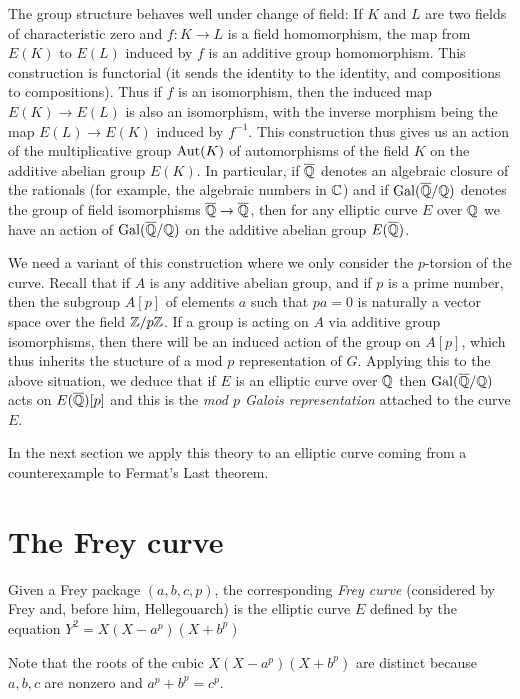 The group structure behaves well under change of field: If $K$ and $L$ are two fields of characteristic zero and $f:K\to L$ is a field homomorphism, the map from $E(K)$ to $E(L)$ induced by $f$ is an additive group homomorphism. This construction is functorial (it sends the identity to the identity, and compositions to compositions). Thus if $f$ is an isomorphism, then the induced map $E(K)\to E(L)$ is also an isomorphism, with the inverse morphism being the map $E(L)\to E(K)$ induced by $f^{-1}$. This construction thus gives us an action of the multiplicative group $\operatorname{Aut}(K)$ of automorphisms of the field $K$ on the additive abelian group $E(K)$. In particular, if $\overline{\mathbb{Q}}$ denotes an algebraic closure of the rationals (for example, the algebraic numbers in $\mathbb{C}$) and if $\operatorname{Gal}(\overline{\mathbb{Q}}/\mathbb{Q})$ denotes the group of field isomorphisms $\overline{\mathbb{Q}}\to\overline{\mathbb{Q}}$, then for any elliptic curve $E$ over $\mathbb{Q}$ we have an action of $\operatorname{Gal}(\overline{\mathbb{Q}}/\mathbb{Q})$ on the additive abelian group $E(\overline{\mathbb{Q}})$.

We need a variant of this construction where we only consider the $p$-torsion of the curve. Recall that if $A$ is any additive abelian group, and if $p$ is a prime number, then the subgroup $A[p]$ of elements $a$ such that $pa=0$ is naturally a vector space over the field $\mathbb{Z}/p\mathbb{Z}$. If a group is acting on $A$ via additive group isomorphisms, then there will be an induced action of the group on $A[p]$, which thus inherits the stucture of a mod $p$ representation of $G$. Applying this to the above situation, we deduce that if $E$ is an elliptic curve over $\mathbb{Q}$ then $\operatorname{Gal}(\overline{\mathbb{Q}}/\mathbb{Q})$ acts on $E(\overline{\mathbb{Q}})[p]$ and this is the \emph{mod $p$ Galois representation} attached to the curve $E$.

In the next section we apply this theory to an elliptic curve coming from a counterexample to Fermat's Last theorem.

\section{The Frey curve}

\begin{definition}[Frey]\label{Frey_curve}
  Given a Frey package $(a,b,c,p)$, the corresponding \emph{Frey curve} (considered by Frey and, before him, Hellegouarch) is the elliptic curve $E$ defined by the equation $Y^2=X(X-a^p)(X+b^p)$\end{definition}

Note that the roots of the cubic $X(X-a^p)(X+b^p)$ are distinct because $a,b,c$ are nonzero and $a^p+b^p=c^p$.

